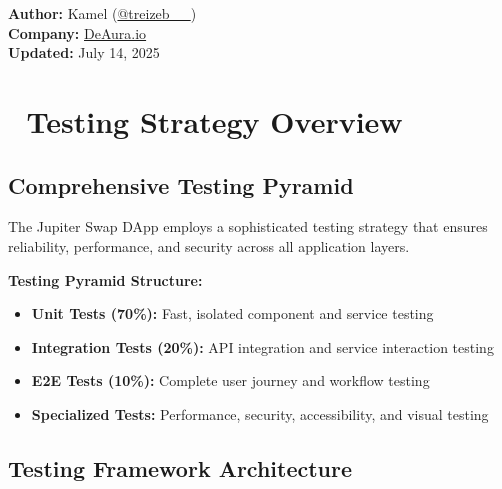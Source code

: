 \documentclass[11pt,a4paper]{article}
\begin{document}
\begin{titlepage}
    \vfill
    
    {\large\textbf{Author:} Kamel (\href{https://x.com/treizeb__}{@treizeb\_\_})\\
    \textbf{Company:} \href{https://deaura.io}{DeAura.io}\\
    \textbf{Updated:} July 14, 2025\par}
\end{titlepage}

\newpage
\tableofcontents
\newpage

\section{🧪 Testing Strategy Overview}

\subsection{Comprehensive Testing Pyramid}

The Jupiter Swap DApp employs a sophisticated testing strategy that ensures reliability, performance, and security across all application layers.

\begin{tcolorbox}[colback=jupiterBlue!10,colframe=jupiterBlue]
\textbf{Testing Pyramid Structure:}
\begin{itemize}
    \item \textbf{Unit Tests (70\%):} Fast, isolated component and service testing
    \item \textbf{Integration Tests (20\%):} API integration and service interaction testing
    \item \textbf{E2E Tests (10\%):} Complete user journey and workflow testing
    \item \textbf{Specialized Tests:} Performance, security, accessibility, and visual testing
\end{itemize}
\end{tcolorbox}

\subsection{Testing Framework Architecture}
\end{document}
